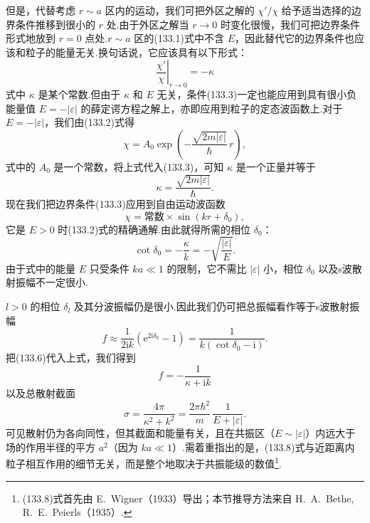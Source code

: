 但是，代替考虑 $r\sim a$ 区内的运动，我们可把外区之解的 $\chi'/\chi$ 给予适当选择的边界条件推移到很小的 $r$ 处.由于外区之解当 $r\to0$ 时变化很慢，我们可把边界条件形式地放到 $r=0$ 点处.$r\sim a$ 区的(133.1)式中不含 $E$，因此替代它的边界条件也应该和粒子的能量无关.换句话说，它应该具有以下形式：
\begin{equation}
  \left.\frac{\chi'}{\chi}\right|_{r\to0}=-\kappa
\end{equation}
式中 $\kappa$ 是某个常数.但由于 $\kappa$ 和 $E$ 无关，条件(133.3)一定也能应用到具有很小负能量值 $E=-|\varepsilon|$ 的薛定谔方程之解上，亦即应用到粒子的定态波函数上.对于 $E=-|\varepsilon|$，我们由(133.2)式得
\begin{equation}
  \chi=A_0\exp\left(-\frac{\sqrt{2m|\varepsilon|}}{\hbar}\,r\right),
\end{equation}
式中的 $A_0$ 是一个常数，将上式代入(133.3)，可知 $\kappa$ 是一个正量并等于
\begin{equation}
  \kappa=\frac{\sqrt{2m|\varepsilon|}}{\hbar}.
\end{equation}
现在我们把边界条件(133.3)应用到自由运动波函数
\begin{equation*}
  \chi=\text{常数}\times\sin(kr+\delta_0),
\end{equation*}
它是 $E>0$ 时(133.2)式的精确通解.由此就得所需的相位 $\delta_0$：
\begin{equation}
  \cot\delta_0=-\frac{\kappa}{k}
  =-\sqrt{\frac{|\varepsilon|}{E}}.
\end{equation}
由于式中的能量 $E$ 只受条件 $ka\ll1$ 的限制，它不需比 $|\varepsilon|$ 小，相位 $\delta_0$ 以及s波散射振幅不一定很小.

$l>0$ 的相位 $\delta_l$ 及其分波振幅仍是很小.因此我们仍可把总振幅看作等于s波散射振幅
\begin{equation*}
  f\approx\frac{1}{2\mathrm{i}k}\left(\mathrm{e}^{2\mathrm{i}\delta_0}-1\right)
  =\frac{1}{k(\cot\delta_0-\mathrm{i})}.
\end{equation*}
把(133.6)代入上式，我们得到
\begin{equation}
  f=-\frac{1}{\kappa+\mathrm{i}k}
\end{equation}
以及总散射截面
\begin{equation}
  \sigma=\frac{4\pi}{\kappa^2+k^2}
  =\frac{2\pi\hbar^2}{m}\,\frac{1}{E+|\varepsilon|}.
\end{equation}
可见散射仍为各向同性，但其截面和能量有关，且在共振区（$E\sim|\varepsilon|$）内远大于场的作用半径的平方 $a^2$（因为 $ka\ll1$）.需着重指出的是，(133.8)式与近距离内粒子相互作用的细节无关，而是整个地取决于共振能级的数值\footnote{(133.8)式首先由 E.~Wigner（1933）导出；本节推导方法来自 H.~A.~Bethe, R.~E.~Peierls（1935）.}.

